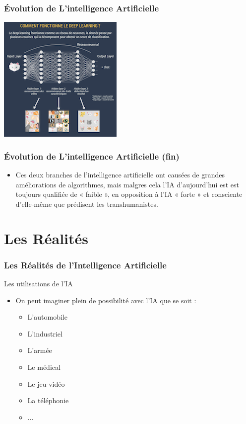\documentclass{beamer}
\begin{document}
	\begin{frame}
	\frametitle{Évolution de L'intelligence  Artificielle}
	
	\centerline{\includegraphics{deeplearning.png}}%
	
	\end{frame}
	
		\begin{frame}
	\frametitle{Évolution de L'intelligence  Artificielle (fin)}
	\begin{itemize}
		\item Ces deux branches de l'intelligence artificielle ont causées de grandes améliorations de algorithmes, mais malgres cela l'IA d'aujourd'hui est est toujours qualifiée de « faible », en opposition à l’IA « forte » et consciente d’elle-même que prédisent les transhumanistes.

	\end{itemize}
	\end{frame}
	
	
	\section{Les Réalités}
	\begin{frame}
	\frametitle{Les Réalités de l'Intelligence Artificielle}
	\begin{block}{Les utilisations de l'IA}
	\begin{itemize}
	\itemsep1em
		\item On peut imaginer plein de possibilité avec l'IA que se soit :
		\begin{itemize}
		\itemsep1em
		\item L'automobile
		\item L'industriel
		\item L'armée
		\item Le médical
		\item Le jeu-vidéo
		\item La téléphonie
		\item ...
		\end{itemize}
		\end{itemize}
	\end{block}
	\end{frame}
	
\end{document}
